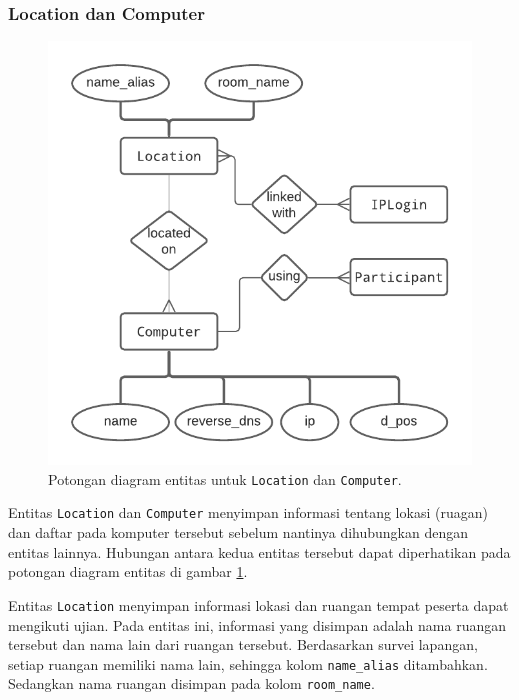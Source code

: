 \subsubsection{Location dan Computer}
    \begin{figure}
        \centering
        \includegraphics{Gambar/erd-details/ERD--New - Location & Computer.pdf}
        \caption{Potongan diagram entitas untuk \texttt{Location} dan
        \texttt{Computer}.}
        \label{fig:erd_location-computer}
    \end{figure}
    
    Entitas \texttt{Location} dan \texttt{Computer} menyimpan informasi tentang
    lokasi (ruagan) dan daftar pada komputer tersebut sebelum nantinya
    dihubungkan dengan entitas lainnya. Hubungan antara kedua entitas tersebut
    dapat diperhatikan pada potongan diagram entitas di gambar
    \ref{fig:erd_location-computer}.
    
    Entitas \texttt{Location} menyimpan informasi lokasi dan ruangan tempat
    peserta dapat mengikuti ujian. Pada entitas ini, informasi yang disimpan
    adalah nama ruangan tersebut dan nama lain dari ruangan tersebut.
    Berdasarkan survei lapangan, setiap ruangan memiliki nama lain, sehingga
    kolom \texttt{name\_alias} ditambahkan. Sedangkan nama ruangan disimpan pada
    kolom \texttt{room\_name}.
    
